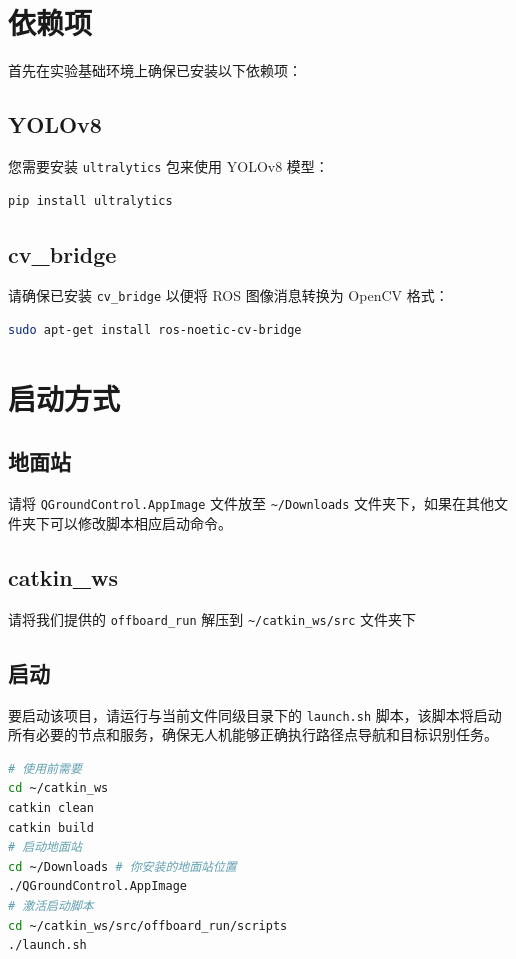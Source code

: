 \documentclass[12pt]{article}
\begin{document}
\section{依赖项}
首先在实验基础环境上确保已安装以下依赖项：

\subsection{YOLOv8}
您需要安装 \texttt{ultralytics} 包来使用 YOLOv8 模型：
\begin{lstlisting}[language=bash]
pip install ultralytics
\end{lstlisting}

\subsection{cv\_bridge}
请确保已安装 \texttt{cv\_bridge} 以便将 ROS 图像消息转换为 OpenCV 格式：
\begin{lstlisting}[language=bash]
sudo apt-get install ros-noetic-cv-bridge
\end{lstlisting}

\section{启动方式}
\subsection{地面站}
请将 \texttt{QGroundControl.AppImage} 文件放至 \texttt{\textasciitilde/Downloads} 文件夹下，如果在其他文件夹下可以修改脚本相应启动命令。

\subsection{catkin\_ws}
请将我们提供的 \texttt{offboard\_run} 解压到 \texttt{\textasciitilde/catkin\_ws/src} 文件夹下

\subsection{启动}
要启动该项目，请运行与当前文件同级目录下的 \texttt{launch.sh} 脚本，该脚本将启动所有必要的节点和服务，确保无人机能够正确执行路径点导航和目标识别任务。
\begin{lstlisting}[language=bash]
# 使用前需要
cd ~/catkin_ws
catkin clean
catkin build
# 启动地面站
cd ~/Downloads # 你安装的地面站位置
./QGroundControl.AppImage
# 激活启动脚本
cd ~/catkin_ws/src/offboard_run/scripts
./launch.sh
\end{lstlisting}
\end{document}
